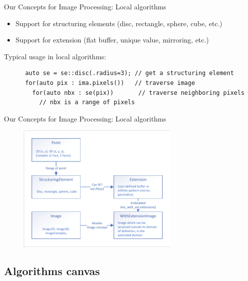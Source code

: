 \documentclass[12pt,aspectratio=169]{beamer}
\begin{document}
\begin{frame}[fragile]{Our Concepts for Image Processing: Local algorithms}
  \begin{itemize}
    \item Support for structuring elements (disc, rectangle, sphere, cube, etc.)
    \item Support for extension (flat buffer, unique value, mirroring, etc.)
  \end{itemize}
  Typical usage in local algorithms:

  \begin{verbatim}
      auto se = se::disc(.radius=3); // get a structuring element
      for(auto pix : ima.pixels())   // traverse image
        for(auto nbx : se(pix))       // traverse neighboring pixels
          // nbx is a range of pixels
  \end{verbatim}
\end{frame}

\begin{frame}[fragile]{Our Concepts for Image Processing: Local algorithms}
  \centering
  \begin{figure}
    \includegraphics[width=0.7\textwidth]{../figures/concepts/se_extension}
  \end{figure}
\end{frame}

\subsection{Algorithms canvas}
\end{document}
